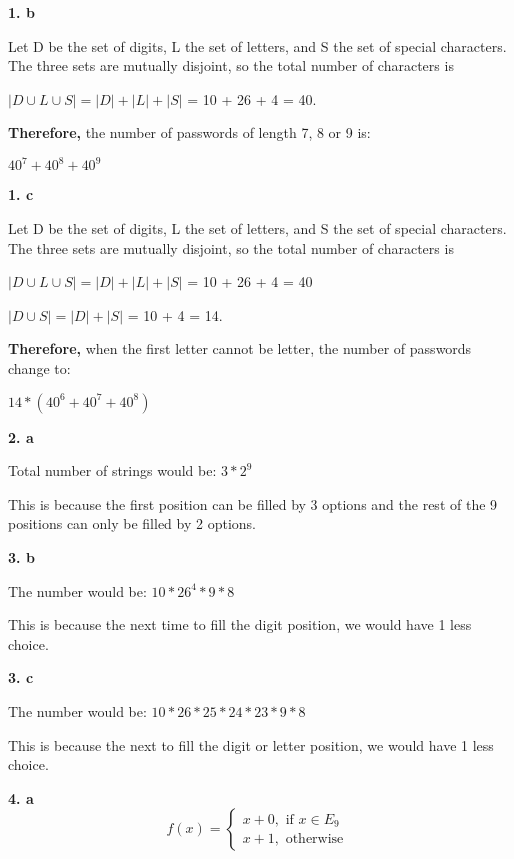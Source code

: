 \documentclass[11pt]{article}
\begin{document}
	\textbf{1. b}
	
	Let D be the set of digits, L the set of letters, and S the set of special characters. The three sets are mutually disjoint, so the total number of characters is
	
	$|D\cup L \cup S| = |D| + |L| + |S|$ = 10 + 26 + 4 = 40. 
	
	\textbf{Therefore,} the number of passwords of length 7, 8 or 9 is: 
	
	$40^7+40^8+40^9$
	
	\vspace{10mm}
	\textbf{1. c}
	
	Let D be the set of digits, L the set of letters, and S the set of special characters. The three sets are mutually disjoint, so the total number of characters is
	
	$|D\cup L \cup S| = |D| + |L| + |S|$ = 10 + 26 + 4 = 40
	
	$|D\cup S| = |D|  + |S|$ = 10 + 4 = 14. 
	
	\textbf{Therefore,} when the first letter cannot be letter, the number of passwords change to:
	
	$14*(40^6+40^7+40^8)$
	
	\vspace{10mm}
	\textbf{2. a}
	
	Total number of strings would be: $3*2^9$
	
	This is because the first position can be filled by 3 options and the rest of the 9 positions can only be filled by 2 options.
	
	\vspace{10mm}
	\textbf{3. b}
	
	The number would be: $10*26^4*9*8$
	
	This is because the next time to fill the digit position, we would have 1 less choice.
	
	\vspace{10mm}
	\textbf{3. c}
	
	The number would be: $10*26*25*24*23*9*8$
	
	This is because the next to fill the digit or letter position, we would have 1 less choice.
	
	\vspace{10mm}
	\textbf{4. a}
	\begin{equation*}
    f(x) = 
    \begin{cases}
    x + 0, \text{ if } x\in E_9\\
    x + 1, \text{ otherwise }
    \end{cases}
    \end{equation*}
    
\end{document}
